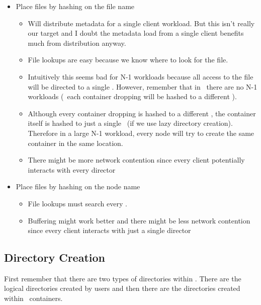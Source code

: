 \documentclass[10pt]{article}
\begin{document}

\begin{itemize}
\item{Place files by hashing on the file name}
\begin{itemize}
\item{Will distribute metadata for
a single client workload.  But this isn't really our target and I doubt the
metadata load from a single client benefits much from distribution anyway.
}
\item{File lookups are easy because we know where to look for the file.}
\item{Intuitively this seems bad for N-1 workloads because all access to the
file will be directed to a single \store.  However, remember that in \plfs\
there are no N-1 workloads (\ie\ each container dropping will be hashed to
a different \store).}
\item{Although every container dropping is hashed to a different \store, the
container itself is hashed to just a single \store\
(if we use lazy directory creation).  Therefore in a large N-1 workload,
every node will try to create the same container in the same location.}
\item{There might be more network contention since every client potentially
interacts with every director}
\end{itemize}
\item{Place files by hashing on the node name}
\begin{itemize}
\item{File lookups must search every \store.} 
\item{Buffering might work better and there might be less network contention
since every client interacts with just a single director} 
\end{itemize}
\end{itemize}

\subsection{Directory Creation}
\label{sec-dir}

First remember that there are two types of directories within \plfs.  There are
the logical directories created by users and then there are the directories
created within \plfs\ containers.  

\end{document}
